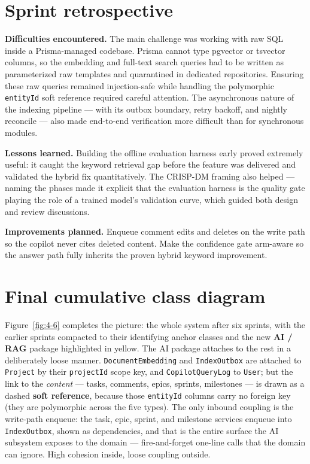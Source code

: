 \section{Sprint retrospective}

\textbf{Difficulties encountered.} The main challenge was working with raw SQL inside a
Prisma-managed codebase. Prisma cannot type pgvector or tsvector columns, so the embedding and
full-text search queries had to be written as parameterized raw templates and quarantined in
dedicated repositories. Ensuring these raw queries remained injection-safe while handling the
polymorphic \texttt{entityId} soft reference required careful attention. The asynchronous nature
of the indexing pipeline --- with its outbox boundary, retry backoff, and nightly reconcile --- also
made end-to-end verification more difficult than for synchronous modules.

\textbf{Lessons learned.} Building the offline evaluation harness early proved extremely useful: it
caught the keyword retrieval gap before the feature was delivered and validated the hybrid fix
quantitatively. The CRISP-DM framing also helped --- naming the phases made it explicit that
the evaluation harness is the quality gate playing the role of a trained model's validation curve,
which guided both design and review discussions.

\textbf{Improvements planned.} Enqueue comment edits and deletes on the write path so the
copilot never cites deleted content. Make the confidence gate arm-aware so the answer path
fully inherits the proven hybrid keyword improvement.

\section{Final cumulative class diagram}

Figure~\ref{fig:4-6} completes the picture: the whole system after six sprints, with the earlier sprints
compacted to their identifying anchor classes and the new \textbf{AI / RAG} package highlighted in yellow. The AI package
attaches to the rest in a deliberately loose manner. \texttt{DocumentEmbedding} and
\texttt{IndexOutbox} are attached to \texttt{Project} by their \texttt{projectId} scope key, and \texttt{CopilotQueryLog} to \texttt{User}; but the
link to the \emph{content} --- tasks, comments, epics, sprints, milestones --- is drawn as a dashed \textbf{soft reference},
because those \texttt{entityId} columns carry no foreign key (they are polymorphic across the five types). The only
inbound coupling is the write-path enqueue: the task, epic, sprint, and milestone services enqueue into
\texttt{IndexOutbox}, shown as dependencies, and that is the entire surface the AI subsystem exposes to the domain ---
fire-and-forget one-line calls that the domain can ignore. High cohesion inside, loose coupling outside.

